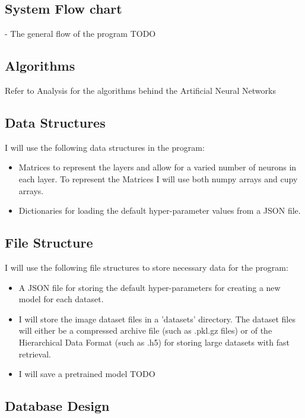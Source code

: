 \documentclass[./project-report/src/latex/project-report.tex]{subfiles}
\begin{document}
\subsection{System Flow chart}  %

- The general flow of the program TODO

\subsection{Algorithms}

Refer to Analysis for the algorithms behind the Artificial Neural Networks

\subsection{Data Structures}

I will use the following data structures in the program:

\begin{itemize}
    \item Matrices to represent the layers and allow for a varied number of neurons in each layer. To represent the Matrices I will use both numpy arrays and cupy 
          arrays.
    \item Dictionaries for loading the default hyper-parameter values from a JSON file.
\end{itemize}

\subsection{File Structure}

I will use the following file structures to store necessary data for the program:

\begin{itemize}
    \item A JSON file for storing the default hyper-parameters for creating a new model for each dataset.
    \item I will store the image dataset files in a 'datasets' directory. The dataset files will either be a compressed archive file (such as .pkl.gz files) or of the 
          Hierarchical Data Format (such as .h5) for storing large datasets with fast retrieval.
    \item I will save a pretrained model TODO
\end{itemize}

\subsection{Database Design}
\end{document}
